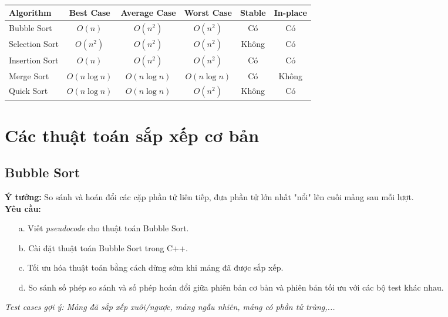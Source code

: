 \documentclass[12pt,a4paper]{article}
\begin{document}
\subsection{}
\begin{table}[H]
\centering
\caption{}
\begin{tabular}{|l|c|c|c|c|c|}
\hline
\textbf{Algorithm} & \textbf{Best Case} & \textbf{Average Case} & \textbf{Worst Case} & \textbf{Stable} & \textbf{In-place} \\ 
\hline
Bubble Sort       & $O(n)$            & $O(n^2)$             & $O(n^2)$            & Có             & Có  \\ 
\hline
Selection Sort    & $O(n^2)$          & $O(n^2)$             & $O(n^2)$            & Không          & Có  \\ 
\hline
Insertion Sort    & $O(n)$            & $O(n^2)$             & $O(n^2)$            & Có             & Có  \\ 
\hline
Merge Sort        & $O(n \log n)$     & $O(n \log n)$        & $O(n \log n)$       & Có             & Không \\ 
\hline
Quick Sort        & $O(n \log n)$     & $O(n \log n)$        & $O(n^2)$            & Không          & Có  \\ 
\hline
\end{tabular}
\end{table}

\section{Các thuật toán sắp xếp cơ bản}
\subsection{Bubble Sort}
\textbf{Ý tưởng:} So sánh và hoán đổi các cặp phần tử liên tiếp, 
                  đưa phần tử lớn nhất "nổi" lên cuối mảng sau mỗi lượt.\\
\textbf{Yêu cầu:}
\begin{enumerate}
    \item[a.] Viết \textit{pseudocode} cho thuật toán Bubble Sort.
    \item[b.] Cài đặt thuật toán Bubble Sort trong C++.
    \item[c.] Tối ưu hóa thuật toán bằng cách dừng sớm khi mảng đã được sắp xếp.
    \item[d.] So sánh số phép so sánh và số phép hoán đổi giữa phiên bản cơ bản 
              và phiên bản tối ưu với các bộ test khác nhau.
\end{enumerate}
\textit{Test cases gợi ý: Mảng đã sắp xếp xuôi/ngược, mảng ngẫu nhiên, mảng có phần tử trùng,...}
\end{document}
